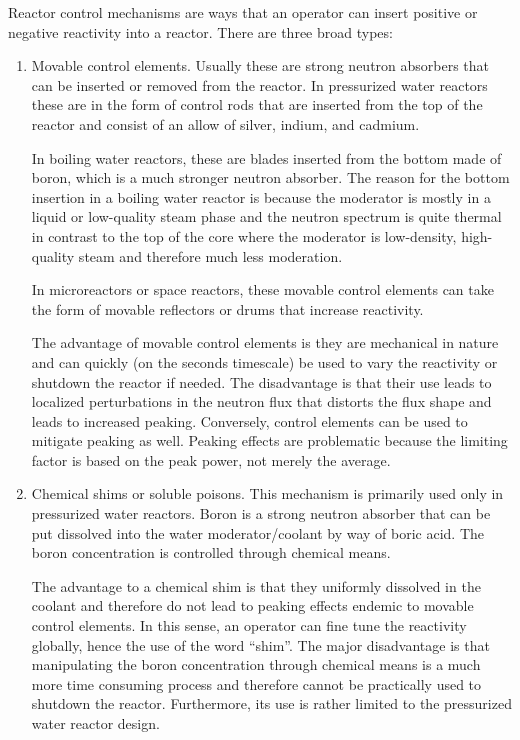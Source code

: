 Reactor control mechanisms are ways that an operator can insert positive or negative reactivity into a reactor. There are three broad types:
\begin{enumerate}
  \item Movable control elements. Usually these are strong neutron absorbers that can be inserted or removed from the reactor. In pressurized water reactors these are in the form of control rods that are inserted from the top of the reactor and consist of an allow of silver, indium, and cadmium. 
  
  In boiling water reactors, these are blades inserted from the bottom made of boron, which is a much stronger neutron absorber. The reason for the bottom insertion in a boiling water reactor is because the moderator is mostly in a liquid or low-quality steam phase and the neutron spectrum is quite thermal in contrast to the top of the core where the moderator is low-density, high-quality steam and therefore much less moderation. 
  
  In microreactors or space reactors, these movable control elements can take the form of movable reflectors or drums that increase reactivity. 
  
  The advantage of movable control elements is they are mechanical in nature and can quickly (on the seconds timescale) be used to vary the reactivity or shutdown the reactor if needed. The disadvantage is that their use leads to localized perturbations in the neutron flux that distorts the flux shape and leads to increased peaking. Conversely, control elements can be used to mitigate peaking as well. Peaking effects are problematic because the limiting factor is based on the peak power, not merely the average.
  
  \item Chemical shims or soluble poisons. This mechanism is primarily used only in pressurized water reactors. Boron is a strong neutron absorber that can be put dissolved into the water moderator/coolant by way of boric acid. The boron concentration is controlled through chemical means.
  
  The advantage to a chemical shim is that they uniformly dissolved in the coolant and therefore do not lead to peaking effects endemic to movable control elements. In this sense, an operator can fine tune the reactivity globally, hence the use of the word ``shim''. The major disadvantage is that manipulating the boron concentration through chemical means is a much more time consuming process and therefore cannot be practically used to shutdown the reactor. Furthermore, its use is rather limited to the pressurized water reactor design.
  

\end{enumerate}
